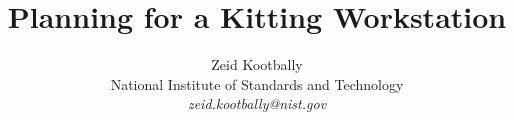 \title{Planning for a Kitting Workstation}
\author{Zeid Kootbally\\ National Institute of Standards and Technology\\
        \emph{zeid.kootbally{@}nist.gov}}
